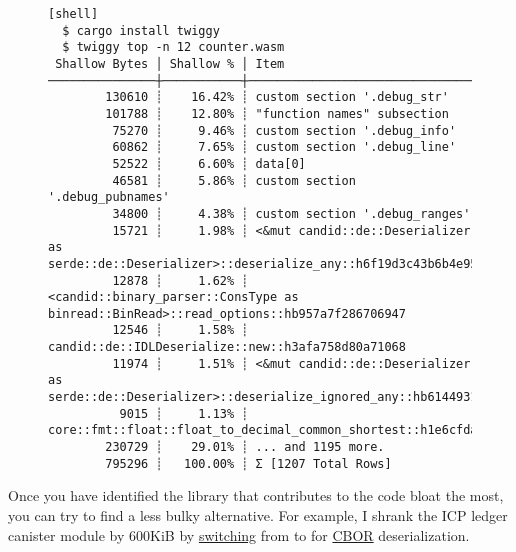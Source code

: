 \documentclass{article}
\begin{document}
\begin{figure}
\begin{verbatim}[shell]
  $ cargo install twiggy
  $ twiggy top -n 12 counter.wasm
 Shallow Bytes │ Shallow % │ Item
───────────────┼───────────┼───────────────────────────────────────────────────────────────────────────────────────────────────────
        130610 ┊    16.42% ┊ custom section '.debug_str'
        101788 ┊    12.80% ┊ "function names" subsection
         75270 ┊     9.46% ┊ custom section '.debug_info'
         60862 ┊     7.65% ┊ custom section '.debug_line'
         52522 ┊     6.60% ┊ data[0]
         46581 ┊     5.86% ┊ custom section '.debug_pubnames'
         34800 ┊     4.38% ┊ custom section '.debug_ranges'
         15721 ┊     1.98% ┊ <&mut candid::de::Deserializer as serde::de::Deserializer>::deserialize_any::h6f19d3c43b6b4e95
         12878 ┊     1.62% ┊ <candid::binary_parser::ConsType as binread::BinRead>::read_options::hb957a7f286706947
         12546 ┊     1.58% ┊ candid::de::IDLDeserialize::new::h3afa758d80a71068
         11974 ┊     1.51% ┊ <&mut candid::de::Deserializer as serde::de::Deserializer>::deserialize_ignored_any::hb61449316ff3dae4
          9015 ┊     1.13% ┊ core::fmt::float::float_to_decimal_common_shortest::h1e6cfda96af3f1c0
        230729 ┊    29.01% ┊ ... and 1195 more.
        795296 ┊   100.00% ┊ Σ [1207 Total Rows]
\end{verbatim}
\end{figure}

Once you have identified the library that contributes to the code bloat the most, you can try to find a less bulky alternative.
For example, I shrank the ICP ledger canister module by 600KiB by \href{https://github.com/dfinity/ic/commit/6f79736085f85dfd01493319816c9a3c9a563b73}{switching} from \href{https://crates.io/crates/serde_cbor}{} to \href{https://crates.io/crates/ciborium}{} for \href{https://cbor.io}{CBOR} deserialization.

\end{document}
